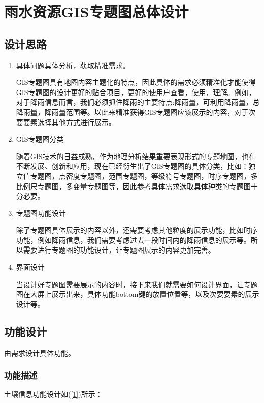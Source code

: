\chapter{雨水资源GIS专题图总体设计}
\section{设计思路}
\begin{enumerate}
	\item 具体问题具体分析，获取精准需求。
	
	GIS专题图具有地图内容主题化的特点，因此具体的需求必须精准化才能使得GIS专题图的设计更好的贴合项目，更好的使用户查看，使用，理解。例如，对于降雨信息而言，我们必须抓住降雨的主要特点:降雨量，可利用降雨量，总降雨量，降雨量范围等。以此来精准获得GIS专题图应该展示的内容，对于次要要素选择其他方式进行展示。
	\item GIS专题图分类
	
	随着GIS技术的日益成熟，作为地理分析结果重要表现形式的专题地图，也在不断发展、创新和应用，现在已经衍生出了GIS专题图的具体分类，比如：独立值专题图，点密度专题图，范围专题图，等级符号专题图，时序专题图，多比例尺专题图，多变量专题图等，因此参考具体需求选取具体种类的专题图十分必要。
	\item 专题图功能设计
	
	除了专题图具体展示的内容以外，还需要考虑其他粒度的展示功能，比如时序功能，例如降雨信息，我们需要考虑过去一段时间内的降雨信息的展示等。所以需要进行专题图的功能设计，让专题图展示的内容更加完善。
	\item 界面设计
	
	当设计好专题图需要展示的内容时，接下来我们就需要如何设计界面，让专题图在大屏上展示出来，具体功能bottom键的放置位置等，以及次要要素的展示设计等。
\end{enumerate}

\section{功能设计}
由需求设计具体功能。
\subsection{功能描述}
土壤信息功能设计如(\ref{1})所示：

